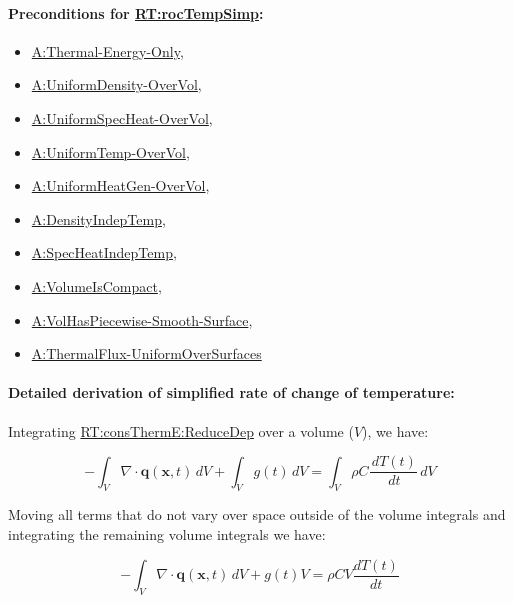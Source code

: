 \documentclass[12pt]{article}
\begin{document}

\paragraph{Preconditions for \hyperref[RT:rocTempSimp]{RT:rocTempSimp}:}
\label{RT:rocTempSimpPrecond}

\begin{itemize}
\item \hyperref[assumpTEO]{A:Thermal-Energy-Only},
\item \hyperref[assumpUnifDens]{A:UniformDensity-OverVol},
\item \hyperref[assumpUnifSpecHeat]{A:UniformSpecHeat-OverVol},
\item \hyperref[assumpUnifTemp]{A:UniformTemp-OverVol},
\item \hyperref[assumpUnifHeatGen]{A:UniformHeatGen-OverVol},
\item \hyperref[assumpDensIndepT]{A:DensityIndepTemp},
\item \hyperref[assumpSpecHeatIndepT]{A:SpecHeatIndepTemp},
\item \hyperref[assumpPiecewiseSmooth]{A:VolumeIsCompact},
\item \hyperref[assumpPiecewiseSmooth]{A:VolHasPiecewise-Smooth-Surface},
\item \hyperref[assumpUnifThermFlux]{A:ThermalFlux-UniformOverSurfaces}
\end{itemize}


\paragraph{Detailed derivation of simplified rate of change of temperature:}
\label{RT:rocTempSimpDeriv}

Integrating \hyperref[RT:consThermE:ReduceDep]{RT:consThermE:ReduceDep} over a
volume ($V$), we have:

\begin{displaymath}
-\int_{V}{∇\cdot{}\symbf{q}(\textbf{x}, t)}\,dV+\int_{V}{g(t)}\,dV=\int_{V}{ρ C \frac{\,dT(t)}{\,dt}}\,dV
\end{displaymath}

Moving all terms that do not vary over space outside of the volume integrals and
integrating the remaining volume integrals we have:

\begin{displaymath}
-\int_{V}{∇\cdot{}\symbf{q}(\textbf{x}, t)}\,dV + g(t) V=ρ C V \frac{dT(t)}{dt}
\end{displaymath}
\end{document}
